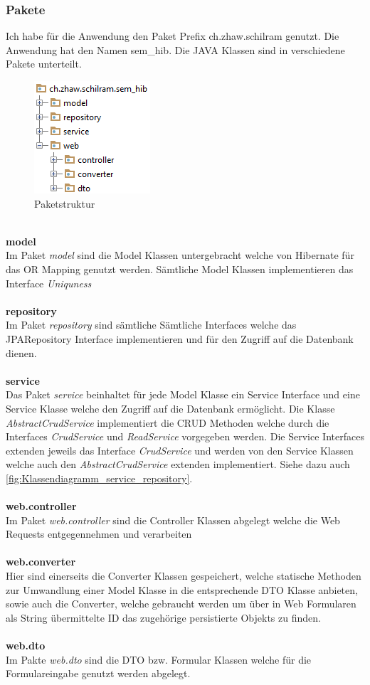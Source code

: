 \subsubsection{Pakete}
Ich habe für die Anwendung den Paket Prefix ch.zhaw.schilram genutzt. Die Anwendung hat den Namen sem\_hib. Die JAVA Klassen sind in verschiedene Pakete unterteilt.
\begin{figure}[h]
\centering
\includegraphics[width=0.2\columnwidth]{graphics/pakete.png}%
	\caption{Paketstruktur}
	\label{fig:Paketstruktur}
\end{figure}
\\
\textbf{model}\\
Im Paket \emph{model} sind die Model Klassen untergebracht welche von Hibernate für das OR Mapping genutzt werden. Sämtliche Model Klassen implementieren das Interface \emph{Uniquness}\\
\\
\textbf{repository}\\
Im Paket \emph{repository} sind sämtliche Sämtliche Interfaces welche das JPARepository Interface implementieren und für den Zugriff auf die Datenbank dienen.\\
\\
\textbf{service}\\
Das Paket \emph{service} beinhaltet für jede Model Klasse ein Service Interface und eine Service Klasse welche den Zugriff auf die Datenbank ermöglicht. Die Klasse \emph{AbstractCrudService} implementiert die CRUD Methoden welche durch die Interfaces \emph{CrudService} und \emph{ReadService} vorgegeben werden. Die Service Interfaces extenden jeweils das Interface \emph{CrudService} und werden von den Service Klassen welche auch den \emph{AbstractCrudService} extenden implementiert. Siehe dazu auch \autoref{fig:Klassendiagramm_service_repository}.  \\
\\
\textbf{web.controller}\\
Im Paket \emph{web.controller} sind die Controller Klassen abgelegt welche die Web Requests entgegennehmen und verarbeiten\\
\\
\textbf{web.converter}\\
Hier sind einerseits die Converter Klassen gespeichert, welche statische Methoden zur Umwandlung einer Model Klasse in die entsprechende DTO Klasse anbieten, sowie auch die Converter, welche gebraucht werden um über in Web Formularen als String übermittelte ID das zugehörige persistierte Objekts zu finden.\\
\\
\textbf{web.dto}\\
Im Pakte \emph{web.dto} sind die DTO bzw. Formular Klassen welche für die Formulareingabe genutzt werden abgelegt.

